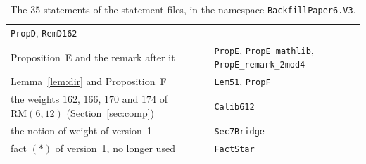 \documentclass[11pt]{article}
\theoremstyle{remark}
\newcommand{\RM}{\mathrm{RM}}
\begin{document}
\begin{table}[ht]
\begin{tabular}{@{}>{\raggedright\arraybackslash}p{}
 >{\raggedright\arraybackslash}p{}@{}}
 \texttt{PropD}, \texttt{RemD162}\\
Proposition~E and the remark after it & \texttt{PropE}, \texttt{PropE\_mathlib},
 \texttt{PropE\_remark\_2mod4}\\
Lemma~\ref{lem:dir} and Proposition~F & \texttt{Lem51}, \texttt{PropF}\\
the weights $162$, $166$, $170$ and $174$ of $\RM(6,12)$ (Section~\ref{sec:comp}) &
 \texttt{Calib612}\\
the notion of weight of version~1 & \texttt{Sec7Bridge}\\
fact $(\ast)$ of version~1, no longer used & \texttt{FactStar}\\
\bottomrule
\end{tabular}
\caption{The $35$ statements of the statement files, in the namespace
\texttt{BackfillPaper6.V3}.}\label{tab:lean}
\end{table}
\end{document}
